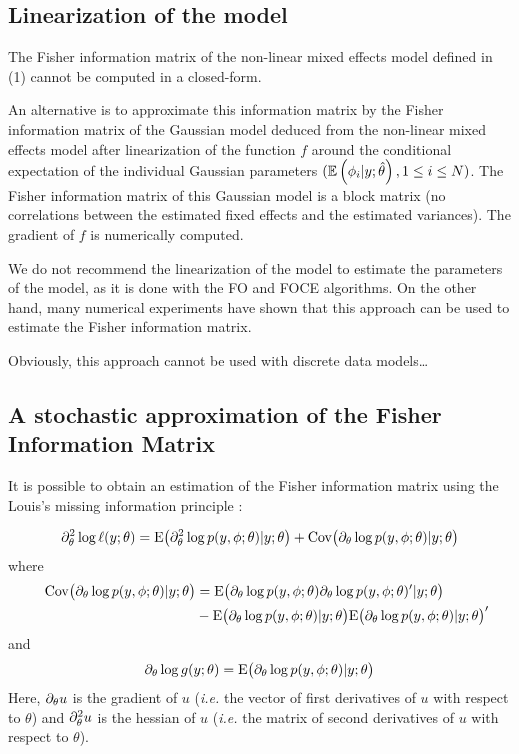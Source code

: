 \subsection{Linearization of the model}
The Fisher information matrix of the non-linear mixed effects model defined in (1) cannot be computed in a closed-form.

An alternative is  to approximate this information matrix  by the Fisher information matrix of the Gaussian model deduced from the non-linear mixed effects model after linearization of the function $f$ around the conditional expectation of the individual Gaussian parameters $(\mathbb{E}\left(\phi_{i}|y;\hat{\theta}\right), 1\leq
i \leq N) $. The Fisher information matrix of this Gaussian model is a block matrix (no correlations between the estimated fixed effects and the estimated variances). The gradient of $f$ is numerically computed.

 We do not recommend the linearization of the model to estimate the parameters of the model, as it is done with the FO and FOCE algorithms. On the other hand, many numerical experiments have shown that this approach can be used to estimate the Fisher information matrix.

 Obviously, this approach cannot be used with discrete data models\ldots

\subsection{A stochastic approximation of the Fisher Information Matrix}
It is possible to obtain an estimation of the Fisher information matrix using the Louis's missing information principle \cite{Louis82}:

\begin{equation}\label{louis}
\partial^2_\theta \log \ell(y;\theta) = \mathrm{E}\big(\partial^2_\theta \log p(y,{\phi}; \theta) | y ; \theta \big) +
\mathrm{Cov}\big(\partial_\theta \log p(y,{\phi};\theta)| y ; \theta \big)
\end{equation}
where
\begin{align*} \quad
\mathrm{Cov}\big(\partial_\theta \log p(y,{\phi};\theta)| y ; \theta \big) &=
\mathrm{E} \big(\partial_\theta \log p(y,{\phi}; \theta) \partial_\theta \log p(y,{\phi}; \theta)^\prime |y ; \theta \big)  \\
& -
\mathrm{E} \big( \partial_\theta \log p(y,{\phi}; \theta) |y ; \theta \big)\mathrm{E} \big( \partial_\theta \log p(y,{\phi}; \theta) |y ; \theta \big)^\prime
\end{align*}
and
$$\partial_\theta \log g(y;\theta) = \mathrm{E} \big( \partial_\theta \log p(y,{\phi}; \theta) |y ; \theta \big)$$
Here, $\partial_\theta u$ is the gradient of $u$ ({\it i.e.} the vector of first derivatives of $u$ with respect to $\theta$) and  $\partial^2_\theta u$ is the hessian of $u$ ({\it i.e.} the matrix of second derivatives of $u$ with respect to $\theta$).

